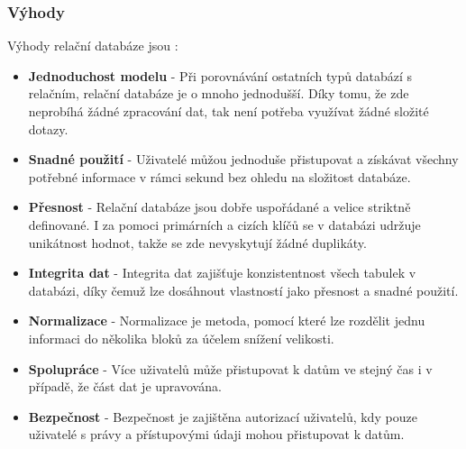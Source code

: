 \subsubsection{Výhody}
Výhody relační databáze jsou \cite{advantages_relational}:
\begin{itemize}
\item \textbf{Jednoduchost modelu} - Při porovnávání ostatních typů databází s relačním, relační databáze je o mnoho jednodušší. Díky tomu, že zde neprobíhá žádné zpracování dat, tak není potřeba využívat žádné složité dotazy.
\item \textbf{Snadné použití} - Uživatelé můžou jednoduše přistupovat a získávat všechny potřebné informace v rámci sekund bez ohledu na složitost databáze.
\item \textbf{Přesnost} - Relační databáze jsou dobře uspořádané a velice striktně definované. I za pomoci primárních a cizích klíčů se v databázi udržuje unikátnost hodnot, takže se zde nevyskytují žádné duplikáty.
\item \textbf{Integrita dat} - Integrita dat zajišťuje konzistentnost všech tabulek v databázi, díky čemuž lze dosáhnout vlastností jako přesnost a snadné použití.
\item \textbf{Normalizace} - Normalizace je metoda, pomocí které lze rozdělit jednu informaci do několika bloků za účelem snížení velikosti.
\item \textbf{Spolupráce} - Více uživatelů může přistupovat k datům ve stejný čas i v případě, že část dat je upravována.
\item \textbf{Bezpečnost} - Bezpečnost je zajištěna autorizací uživatelů, kdy pouze uživatelé s právy a přístupovými údaji mohou přistupovat k datům.
\end{itemize}
